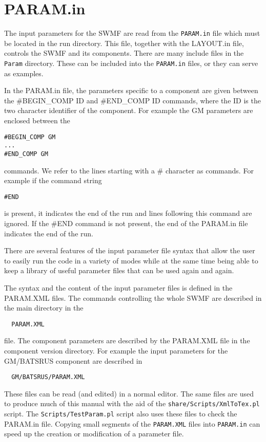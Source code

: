 %

\section{PARAM.in \label{section:param.in}}

The input parameters for the SWMF are read from the 
{\tt PARAM.in} file which must be located in the run directory.
This file, together with the LAYOUT.in file, controls the SWMF
and its components.
There are many include files in the {\tt Param} directory. These
can be included into the {\tt PARAM.in} files, or they can serve as
examples. 

In the PARAM.in file, 
the parameters specific to a component are given between
the \#BEGIN\_COMP ID and \#END\_COMP ID commands,
where the ID is the two character identifier of the component.
For example the GM parameters are enclosed between the 
\begin{verbatim}
#BEGIN_COMP GM
...
#END_COMP GM
\end{verbatim}
commands. We refer to the lines starting with a \# character as commands.
For example if the command string 
\begin{verbatim}
#END
\end{verbatim}
is present, it indicates the end of the run and lines following
this command are ignored. If the \#END command is not
present, the end of the PARAM.in file indicates the end of the run.

There are several features of the input parameter file syntax
that allow the user to easily run the code
in a variety of modes while at the same time being able to 
keep a library of useful parameter files that can be used
again and again.

The syntax and the content of the input parameter files
is defined in the PARAM.XML files. The commands controlling
the whole SWMF are described in the main directory in the
\begin{verbatim}
  PARAM.XML
\end{verbatim}
file. The component parameters are described by the PARAM.XML
file in the component version directory. For example the
input parameters for the GM/BATSRUS component are described in
\begin{verbatim}
  GM/BATSRUS/PARAM.XML
\end{verbatim}
These files can be read (and edited) in a normal editor.
The same files are used to produce much of this
manual with the aid of the {\tt share/Scripts/XmlToTex.pl} script. 
The {\tt Scripts/TestParam.pl} script also uses these files
to check the PARAM.in file.
Copying small segments of the {\tt PARAM.XML} files
into {\tt PARAM.in} can speed up the creation or modification of a 
parameter file. 

